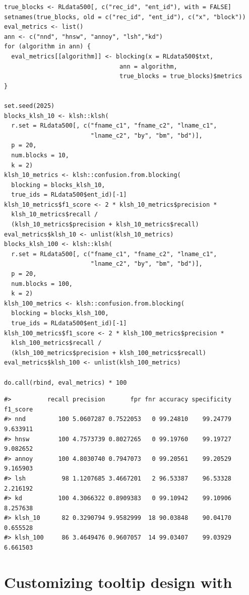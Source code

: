 \begin{verbatim}
true_blocks <- RLdata500[, c("rec_id", "ent_id"), with = FALSE]
setnames(true_blocks, old = c("rec_id", "ent_id"), c("x", "block"))
eval_metrics <- list()
ann <- c("nnd", "hnsw", "annoy", "lsh","kd")
for (algorithm in ann) {
  eval_metrics[[algorithm]] <- blocking(x = RLdata500$txt,
                                ann = algorithm,
                                true_blocks = true_blocks)$metrics
}

set.seed(2025)
blocks_klsh_10 <- klsh::klsh(
  r.set = RLdata500[, c("fname_c1", "fname_c2", "lname_c1",
                        "lname_c2", "by", "bm", "bd")],
  p = 20,
  num.blocks = 10,
  k = 2)
klsh_10_metrics <- klsh::confusion.from.blocking(
  blocking = blocks_klsh_10, 
  true_ids = RLdata500$ent_id)[-1]
klsh_10_metrics$f1_score <- 2 * klsh_10_metrics$precision *
  klsh_10_metrics$recall / 
  (klsh_10_metrics$precision + klsh_10_metrics$recall)
eval_metrics$klsh_10 <- unlist(klsh_10_metrics)
blocks_klsh_100 <- klsh::klsh(
  r.set = RLdata500[, c("fname_c1", "fname_c2", "lname_c1",
                        "lname_c2", "by", "bm", "bd")],
  p = 20,
  num.blocks = 100,
  k = 2)
klsh_100_metrics <- klsh::confusion.from.blocking(
  blocking = blocks_klsh_100, 
  true_ids = RLdata500$ent_id)[-1]
klsh_100_metrics$f1_score <- 2 * klsh_100_metrics$precision * 
  klsh_100_metrics$recall /
  (klsh_100_metrics$precision + klsh_100_metrics$recall)
eval_metrics$klsh_100 <- unlist(klsh_100_metrics)

do.call(rbind, eval_metrics) * 100
\end{verbatim}

\begin{verbatim}
#>          recall precision       fpr fnr accuracy specificity f1_score
#> nnd         100 5.0607287 0.7522053   0 99.24810    99.24779 9.633911
#> hnsw        100 4.7573739 0.8027265   0 99.19760    99.19727 9.082652
#> annoy       100 4.8030740 0.7947073   0 99.20561    99.20529 9.165903
#> lsh          98 1.1207685 3.4667201   2 96.53387    96.53328 2.216192
#> kd          100 4.3066322 0.8909383   0 99.10942    99.10906 8.257638
#> klsh_10      82 0.3290794 9.9582999  18 90.03848    90.04170 0.655528
#> klsh_100     86 3.4649476 0.9607057  14 99.03407    99.03929 6.661503
\end{verbatim}

\section{\texorpdfstring{Customizing tooltip design with }{Customizing tooltip design with }}\label{customizing-tooltip-design-with}

